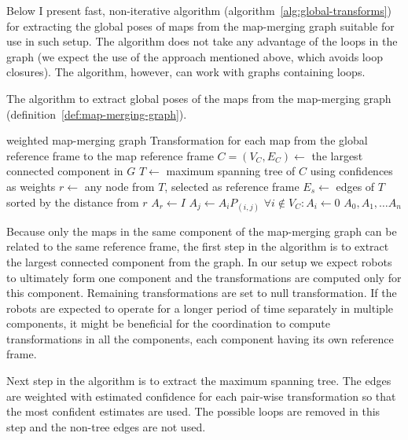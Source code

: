 Below I present fast, non-iterative algorithm (algorithm~\ref{alg:global-transforms}) for extracting the global poses of maps from the map-merging graph suitable for use in such setup. The algorithm does not take any advantage of the loops in the graph (we expect the use of the approach mentioned above, which avoids loop closures). The algorithm, however, can work with graphs containing loops.

\begin{algorithm}
    \caption[Global poses extraction]{The algorithm to extract global poses of the maps from the map-merging graph (definition~\ref{def:map-merging-graph}).}
    \label{alg:global-transforms}
    \begin{algorithmic}[1]
        \Require weighted map-merging graph
        \Ensure Transformation for each map from the global reference frame to the map reference frame
            \State $C = (V_C, E_C) \gets$ the largest connected component in $G$
            \State $T \gets$ maximum spanning tree of $C$ using confidences as weights
            \State $r \gets$ any node from $T$, selected as reference frame
            \State $E_s \gets$ edges of $T$ sorted by the distance from $r$
            \State $A_r \gets I$
                \State $A_j \gets A_i P_{(i,j)}$
            \EndFor
            \State $\forall i \not\in V_C: A_i \gets 0$
            \State \Return $A_0, A_1, \dots A_n$
        \EndFunction
    \end{algorithmic}
\end{algorithm}

Because only the maps in the same component of the map-merging graph can be related to the same reference frame, the first step in the algorithm is to extract the largest connected component from the graph. In our setup we expect robots to ultimately form one component and the transformations are computed only for this component. Remaining transformations are set to null transformation. If the robots are expected to operate for a longer period of time separately in multiple components, it might be beneficial for the coordination to compute transformations in all the components, each component having its own reference frame.

Next step in the algorithm is to extract the maximum spanning tree. The edges are weighted with estimated confidence for each pair-wise transformation so that the most confident estimates are used. The possible loops are removed in this step and the non-tree edges are not used.

